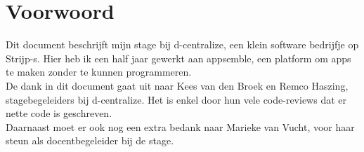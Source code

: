 \chapter{Voorwoord}
Dit document beschrijft mijn stage bij d-centralize, een klein software bedrijfje op Strijp-s. Hier heb ik een half jaar gewerkt aan appsemble, een platform om apps te maken zonder te kunnen programmeren. \\

De dank in dit document gaat uit naar Kees van den Broek en Remco Haszing, stagebegeleiders bij d-centralize. Het is enkel door hun vele code-reviews dat er nette code is geschreven. \\

Daarnaast moet er ook nog een extra bedank naar Marieke van Vucht, voor haar steun als docentbegeleider bij de stage.